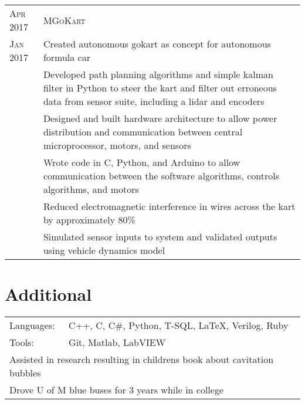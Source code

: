 \documentclass[a4paper,12pt]{article} %
\begin{document}

\begin{tabular}{R{2.1cm}|p{15.5cm}}
\hspace{4pt}\textsc{Apr 2017} & \textsc{MGoKart} \\
\textsc{Jan 2017} & \footnotesize{Created autonomous gokart as concept for
 autonomous formula car} \\
& \footnotesize{Developed path planning algorithms and simple kalman filter in
  Python to steer the kart and filter out erroneous data from sensor suite,
  including a lidar and encoders} \\
& \footnotesize{Designed and built hardware architecture to allow power
 distribution and communication between central microprocessor, motors, and
 sensors} \\
& \footnotesize{Wrote code in C, Python, and Arduino to allow communication
 between the software algorithms, controls algorithms, and motors} \\
& \footnotesize{Reduced electromagnetic interference in wires across the kart by
 approximately 80\%} \\
& \footnotesize{Simulated sensor inputs to system and validated outputs using
 vehicle dynamics model} \\
\end{tabular}


\section{Additional}

\begin{tabular}{ll}
Languages: & C++, C, C\#, Python, T-SQL, \LaTeX, Verilog, Ruby \\
Tools: & Git, Matlab, LabVIEW \\
\multicolumn{2}{l}{Assisted in research resulting in childrens book about
  cavitation bubbles}\\
\multicolumn{2}{l}{Drove U of M blue buses for 3 years while in college}\\
\end{tabular}

\clearpage %

\end{document}
